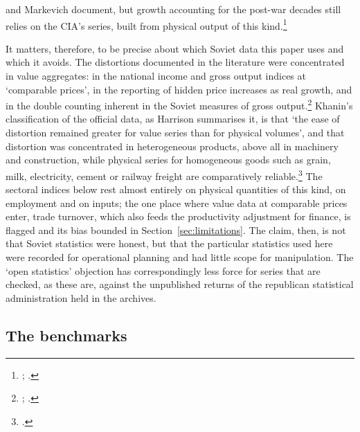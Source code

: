 and Markevich document, but growth accounting for the post-war decades still relies on the CIA's series, built from physical output of this kind.\footnote{\autocite[48, 51]{zhuravskaya2024}; \autocite[872, 874]{voskoboynikov2021}.}

It matters, therefore, to be precise about which Soviet data this paper uses and which it avoids. The distortions documented in the literature were concentrated in value aggregates: in the national income and gross output indices at `comparable prices', in the reporting of hidden price increases as real growth, and in the double counting inherent in the Soviet measures of gross output.\footnote{\autocite[307--8]{Maddison1998b}; \autocite[253]{vonyo2017}.} Khanin's classification of the official data, as Harrison summarises it, is that `the ease of distortion remained greater for value series than for physical volumes', and that distortion was concentrated in heterogeneous products, above all in machinery and construction, while physical series for homogeneous goods such as grain, milk, electricity, cement or railway freight are comparatively reliable.\footnote{\autocite[144, 152]{harrison1993}.} The sectoral indices below rest almost entirely on physical quantities of this kind, on employment and on inputs; the one place where value data at comparable prices enter, trade turnover, which also feeds the productivity adjustment for finance, is flagged and its bias bounded in Section~\ref{sec:limitations}. The claim, then, is not that Soviet statistics were honest, but that the particular statistics used here were recorded for operational planning and had little scope for manipulation. The `open statistics' objection has correspondingly less force for series that are checked, as these are, against the unpublished returns of the republican statistical administration held in the archives.

\subsection{The benchmarks}

